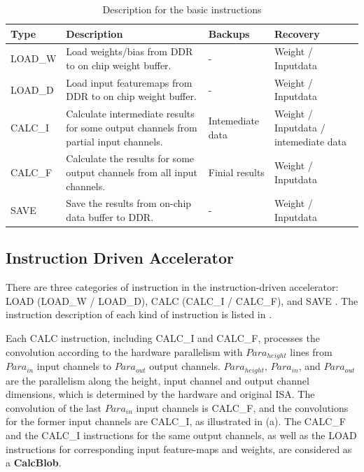 \label{sec:cnninterrupt}


\begin{table}[t]
	\centering
	\scriptsize
	\caption{Description for the basic instructions}
\begin{tabular}{|p{4em}|p{12em}||p{6em}|p{6em}|}
	\hline
	Type & Description & Backups & Recovery \bigstrut\\
	\hline
	LOAD\_W & Load weights/bias from DDR to on chip weight buffer. & - & Weight / Inputdata \bigstrut\\
	\hline
	LOAD\_D & Load input featuremaps from DDR to on chip weight buffer. & - & Weight / Inputdata \bigstrut\\
	\hline
	CALC\_I & Calculate intermediate results for some output channels from partial input channels. &  Intemediate data & Weight / Inputdata / intemediate data \bigstrut\\
	\hline
	CALC\_F & Calculate the results for some output channels from all input channels. & Finial results & Weight / Inputdata \bigstrut\\
	\hline
	SAVE & Save the results from on-chip data buffer to DDR. & - & Weight / Inputdata \bigstrut\\
	\hline
	\end{tabular}%
	
	\label{tab:instr}%
 \end{table}%
 




\subsection{ Instruction Driven Accelerator }
\label{sec:instrAcc}
There are three categories of instruction in the instruction-driven accelerator: LOAD (LOAD\_W / LOAD\_D), CALC (CALC\_I / CALC\_F), and SAVE \cite{guo2017angel,qiu2016going,yu2018instruction}. The instruction description of each kind of instruction is listed in . 

Each CALC instruction, including CALC\_I and CALC\_F, processes the convolution according to the hardware parallelism with $Para_{height}$ lines from $ Para_{in} $ input channels to $ Para_{out}$ output channels. $Para_{height}$, $ Para_{in} $, and $ Para_{out} $ are the parallelism along the height, input channel and output channel dimensions, which is determined by the hardware and original ISA. The convolution of the last $ Para_{in} $ input channels is CALC\_F, and the convolutions for the former input channels are CALC\_I, as illustrated in (a). The CALC\_F and the CALC\_I instructions for the same output channels, as well as the LOAD instructions for corresponding input feature-maps and weights, are considered as a \textbf{CalcBlob}.



